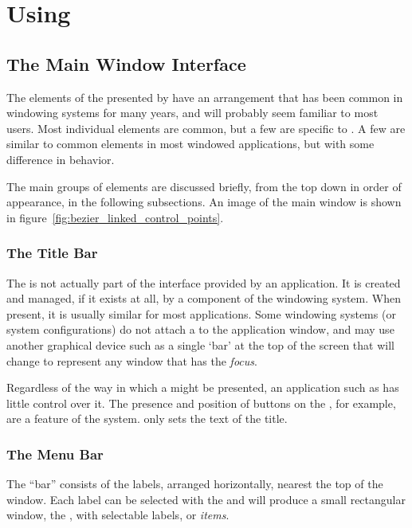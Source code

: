 \chapter{Using \dtypkgu{}}
\label{chap:using_epspline}

	\section{The Main Window Interface}%
	\label{sec:window_interface}
	The elements of the  presented by \IXpkg{}
	have an arrangement that has been common in
	windowing systems for many years, and will probably
	seem familiar to most users. Most individual elements are common,
	but a few are specific to \IXpkg{}. A few are similar
	to common elements in most windowed applications,
	but with some difference in behavior.

	The main groups of  elements are
	discussed briefly, from the top down in order of appearance,
	in the following subsections. An image of the main window
	is shown in figure~\ref{fig:bezier_linked_control_points}.

		\subsection{The Title Bar}%
		\label{ssec:title_bar}
		The  is not actually part of
		the interface provided by an application. It is
		created and managed, if it exists at all, by a
		component of the windowing system. When present,
		it is usually similar for most applications. Some
		windowing systems (or system configurations) do not
		attach a  to the application window,
		and may use another graphical device such as a
		single `bar' at the top of the screen that will
		change to represent any window that has the \emph{focus}.
		
		Regardless of the way in which a 
		might be presented, an application such as \IXpkg{}
		has little control over it. The presence and position
		of buttons on the , for example,
		are a feature of the system. \IXpkgu{} only sets
		the text of the title.

		\subsection{The Menu Bar}%
		\label{ssec:menu_bar}
		The  ``bar'' consists of the labels, arranged
		horizontally, nearest the top of the window. Each
		label can be selected with the  and
		will produce a small rectangular window, the
		, with selectable labels, or
		\emph{items}.
		

